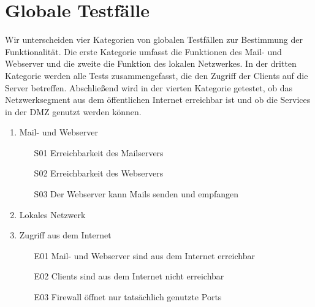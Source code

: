\section{Globale Testfälle}

Wir unterscheiden vier Kategorien von globalen Testfällen zur Bestimmung der Funktionalität. Die erste Kategorie umfasst die Funktionen des Mail- und Webserver und die zweite die Funktion des lokalen Netzwerkes. In der dritten Kategorie werden alle Tests zusammengefasst, die den Zugriff der Clients auf die Server betreffen. Abschließend wird in der vierten Kategorie getestet, ob das Netzwerksegment aus dem öffentlichen Internet erreichbar ist und ob die Services in der DMZ genutzt werden können.

\begin{enumerate}
	\item Mail- und Webserver
		\begin{itemize}
			\item[S01] Erreichbarkeit des Mailservers
			\item[S02] Erreichbarkeit des Webservers
			\item[S03] Der Webserver kann Mails senden und empfangen
		\end{itemize}
	\item Lokales Netzwerk
	\item Zugriff aus dem Internet
		\begin{itemize}
			\item[E01] Mail- und Webserver sind aus dem Internet erreichbar
			\item[E02] Clients sind aus dem Internet nicht erreichbar
			\item[E03] Firewall öffnet nur tatsächlich genutzte Ports
		\end{itemize}
\end{enumerate}


